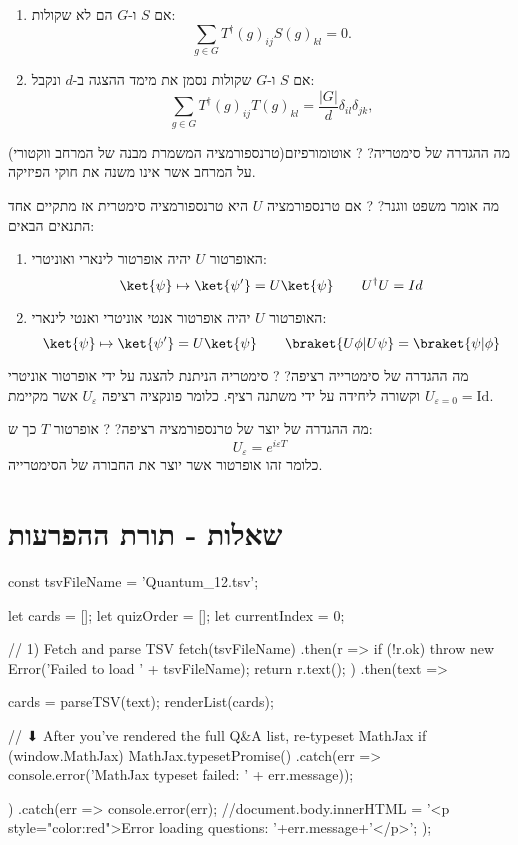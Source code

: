 \documentclass{tstextbook}
\begin{document}
\begin{enumerate}
  \item אם \(S\) ו-\(G\) הם לא שקולות: 
$$\sum_{g\in G}T^{\dagger}(g)_{i j}S(g)_{k l}=0.$$


  \item אם \(S\) ו-\(G\) שקולות נסמן את מימד ההצגה ב-\(d\) ונקבל: 
$$\sum_{g\in G}T^{\dagger}(g)_{i j}T(g)_{k l}=\frac{|G|}{d}\delta_{i l}\delta_{j k},$$


\end{enumerate}
מה ההגדרה של סימטריה?
?
אוטומורפיזם(טרנספורמציה המשמרת מבנה של המרחב ווקטורי) על המרחב אשר אינו משנה את חוקי הפיזיקה.

מה אומר משפט ווגנר?
?
אם טרנספורמציה \(U\) היא טרנספורמציה סימטרית אז מתקיים אחד התנאים הבאים:

\begin{enumerate}
  \item האופרטור \(U\) יהיה אופרטור לינארי ואוניטרי: 
$$\ket{\psi} \mapsto \ket{\psi'} =U\ket{\psi} \qquad U^{\dagger} U = Id $$


  \item האופרטור \(U\) יהיה אופרטור אנטי אוניטרי ואנטי לינארי: 
$$\ket{\psi} \mapsto \ket{\psi'} =U\ket{\psi} \qquad \braket{ U\phi | U\psi } =\braket{ \psi | \phi } $$


\end{enumerate}
מה ההגדרה של סימטרייה רציפה?
?
סימטריה הניתנת להצגה על ידי אופרטור אוניטרי וקשורה ליחידה על ידי משתנה רציף. כלומר פונקציה רציפה \(U_{\varepsilon}\) אשר מקיימת \(U_{\varepsilon=0}=\mathrm{Id}\).

מה ההגדרה של יוצר של טרנספורמציה רציפה?
?
אופרטור \(T\) כך ש:
$$U_{\varepsilon}=e^{ i\varepsilon T }$$
כלומר זהו אופרטור אשר יוצר את החבורה של הסימטרייה.

\section{שאלות - תורת ההפרעות}


    const tsvFileName = 'Quantum_12.tsv';

    let cards = [];
    let quizOrder = [];
    let currentIndex = 0;

    // 1) Fetch and parse TSV
fetch(tsvFileName)
  .then(r => {
    if (!r.ok) throw new Error('Failed to load ' + tsvFileName);
    return r.text();
  })
  .then(text => {
    cards = parseTSV(text);
    renderList(cards);

    // ⬇ After you’ve rendered the full Q&A list, re-typeset MathJax
    if (window.MathJax) {
      MathJax.typesetPromise()
        .catch(err => console.error('MathJax typeset failed: ' + err.message));
    }
  })
  .catch(err => {
    console.error(err);
    //document.body.innerHTML =  '<p style="color:red">Error loading questions: '+err.message+'</p>';
  });
\end{document}
